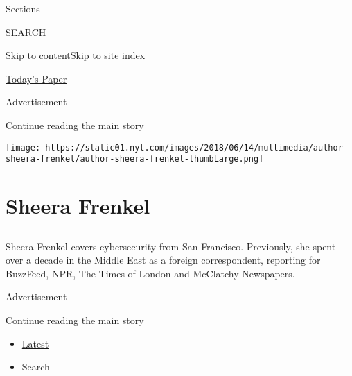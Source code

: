 Sections

SEARCH

\protect\hyperlink{site-content}{Skip to
content}\protect\hyperlink{site-index}{Skip to site index}

\href{https://myaccount.nytimes.com/auth/login?response_type=cookie\&client_id=vi}{}

\href{https://www.nytimes.com/section/todayspaper}{Today's Paper}

Advertisement

\protect\hyperlink{after-top}{Continue reading the main story}

\texttt{[image: https://static01.nyt.com/images/2018/06/14/multimedia/author-sheera-frenkel/author-sheera-frenkel-thumbLarge.png]}

\hypertarget{sheera-frenkel}{%
\section{Sheera Frenkel}\label{sheera-frenkel}}

\subsection{}

Sheera Frenkel covers cybersecurity from San Francisco. Previously, she
spent over a decade in the Middle East as a foreign correspondent,
reporting for BuzzFeed, NPR, The Times of London and McClatchy
Newspapers.

Advertisement

\protect\hyperlink{after-mid1}{Continue reading the main story}

\begin{itemize}
\tightlist
\item
  \protect\hyperlink{stream-panel}{Latest}
\item
  Search
\end{itemize}

